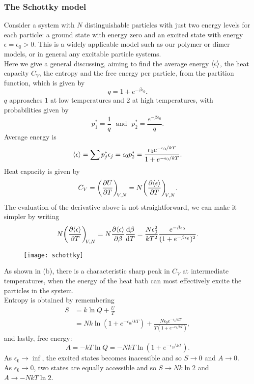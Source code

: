 \subsubsection{The Schottky model}
Consider a system with $N$ distinguishable particles with just two energy levels 
for each particle: a ground state with energy zero and an excited state with energy 
$\epsilon=\epsilon_0>0$. This is a widely applicable model such as our polymer or dimer models, 
or in general any excitable particle systems. \\
Here we give a general discussing, aiming to find the average energy $\langle \epsilon\rangle$, 
the heat capacity $C_V$, the entropy and the free energy per particle, from the partition function, which is given by
\begin{equation}
q=1+e^{-\beta\epsilon_0}.
\end{equation}
$q$ approaches $1$ at low temperatures and $2$ at high temperatures, with probabilities given by
\begin{equation}
p_1^*=\frac{1}{q}\ \ \ \text{and}\ \ \ p_2^*=\frac{e^{-\beta\epsilon_0}}{q}.
\end{equation}
Average energy is 
\begin{equation}
\langle \epsilon\rangle=\sum p_j^*\epsilon_j=\epsilon_0p_2^*=\frac{\epsilon_0e^{-\epsilon_0/kT}}{1+e^{-\epsilon_0/kT}}.
\end{equation}
Heat capacity is given by
\begin{equation}
C_V=\diffp UT[V,N]=N\diffp{\lgl \epsilon\rgl}{T}[V,N].
\end{equation}
The evaluation of the derivative above is not straightforward, we can make it simpler by writing 
\begin{equation}
N\diffp{\lgl \epsilon\rgl}{T}[V,N]=N\diffp{\lgl \epsilon\rgl}{\beta}\diff{\beta}{T}=\frac{N\epsilon_0^2}{kT^2}\frac{e^{-\beta\epsilon_0}}{(1+e^{-\beta\epsilon_0})^2}.
\end{equation}
\begin{figure}[ht]
	\texttt{[image: schottky]}
	\centering
	\caption{}
	\label{fig:schottky}
\end{figure}
As shown in  (b), there is a characteristic sharp peak in $C_V$ 
at intermediate temperatures, when the energy of the heat bath can most effectively 
excite the particles in the system. \\
Entropy is obtained by remembering
\begin{subequations}
\begin{align}
S&=k\ln Q+\frac{U}{T}\\
&=Nk\ln (1+e^{-\epsilon_0/kT})+\frac{N\epsilon_0e^{-\epsilon_0/kT}}{T(1+e^{-\epsilon_0/kT})}, 
\end{align}
\end{subequations}
and lastly, free energy:
\begin{equation}
A=-kT\ln Q=-NkT\ln(1+e^{-\epsilon_0/kT}).
\end{equation}
As $\epsilon_0\rightarrow\inf$, the excited states becomes inacessible and so 
$S\rightarrow0$ and $A\rightarrow0$. \\
As $\epsilon_0\rightarrow0$, two states are equally accessible and so 
$S\rightarrow Nk\ln 2$ and $A\rightarrow -NkT\ln 2$. 
